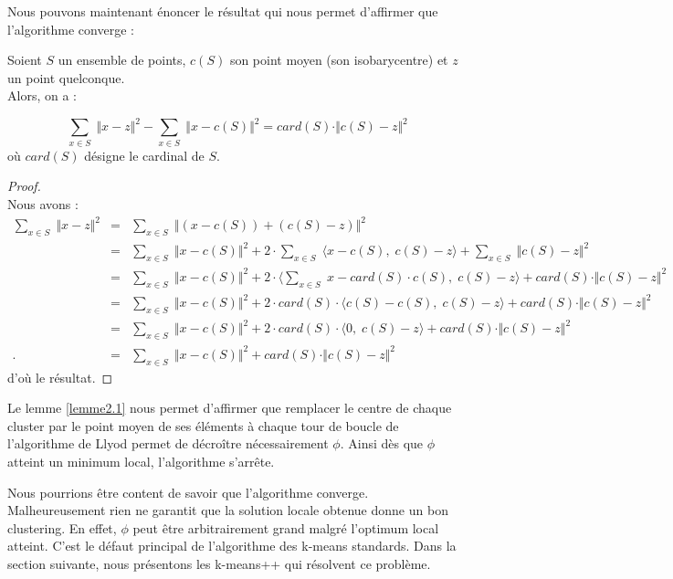 \documentclass[12pt,a4paper]{book}
\newcommand{\1}{\mathds{1}}
\begin{document}
Nous pouvons maintenant énoncer le résultat qui nous permet d'affirmer que l'algorithme converge :

	\begin{env_lemme}\label{lemme2.1}
		Soient $S$ un ensemble de points, $c(S)$ son point moyen (son isobarycentre) et $z$ un point quelconque.\\
		Alors, on a :
		
		$$
			\sum_{x \in S} \; \Vert x-z \Vert^2 - \sum_{x \in S} \; \Vert x-c(S) \Vert^2 = card(S) \cdot \Vert c(S)-z \Vert^2
		$$
		où $card(S)$ désigne le cardinal de $S$.
	\end{env_lemme}	
	
	\begin{proof}
		~\\
		Nous avons :
		\begin{eqnarray*}
			\sum_{x \in S} \; \Vert x-z \Vert^2 &=& \sum_{x \in S} \; \Vert \left( x - c(S) \right) + \left( c(S)- z \right) \Vert^2 \\
			& = & \sum_{x \in S} \; \Vert x - c(S) \Vert^2 + 2 \cdot \sum_{x \in S} \; \langle x - c(S), \; c(S)- z \rangle + \sum_{x \in S} \; \Vert c(S)- z \Vert^2 \\
			& = & \sum_{x \in S} \; \Vert x - c(S) \Vert^2 + 2 \cdot \langle \sum_{x \in S} \; x - card(S) \cdot c(S), \; c(S)- z \rangle + card(S) \cdot \Vert c(S)- z \Vert^2 \\
			& = & \sum_{x \in S} \; \Vert x - c(S) \Vert^2 + 2 \cdot card(S) \cdot \langle c(S) - c(S), \; c(S)- z \rangle + card(S) \cdot \Vert c(S)- z \Vert^2 \\
			& = & \sum_{x \in S} \; \Vert x - c(S) \Vert^2 + 2 \cdot card(S) \cdot \langle 0, \; c(S)- z \rangle + card(S) \cdot\Vert c(S)- z \Vert^2 \\.
			& = & \sum_{x \in S} \; \Vert x - c(S) \Vert^2 + card(S) \cdot \Vert c(S)- z \Vert^2
		\end{eqnarray*}
		d'où le résultat.
	\end{proof}

Le lemme \ref{lemme2.1} nous permet d'affirmer que remplacer le centre de chaque cluster par le point moyen de ses éléments à chaque tour de boucle de l'algorithme de Llyod permet de décroître nécessairement $\phi$. Ainsi dès que $\phi$ atteint un minimum local, l'algorithme s'arrête.

Nous pourrions être content de savoir que l'algorithme converge. Malheureusement rien ne garantit que la solution locale obtenue donne un bon clustering. En effet, $\phi$  peut être arbitrairement grand malgré l'optimum local atteint. C'est le défaut principal de l'algorithme des k-means standards. Dans la section suivante, nous présentons les k-means++ qui résolvent ce problème.
\end{document}
